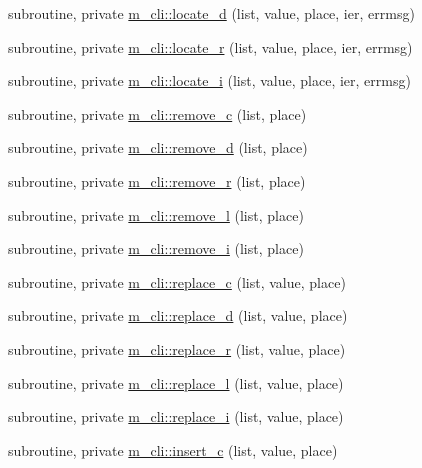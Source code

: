 \begin{DoxyCompactItemize}
\item 
subroutine, private \mbox{\hyperlink{namespacem__cli_a4187c24a2abf5cc630232965637493e8}{m\+\_\+cli\+::locate\+\_\+d}} (list, value, place, ier, errmsg)
\item 
subroutine, private \mbox{\hyperlink{namespacem__cli_ac44389e115b536069f324bffea7d2469}{m\+\_\+cli\+::locate\+\_\+r}} (list, value, place, ier, errmsg)
\item 
subroutine, private \mbox{\hyperlink{namespacem__cli_a36665ab0ea5080c14c8c9e52ed07d397}{m\+\_\+cli\+::locate\+\_\+i}} (list, value, place, ier, errmsg)
\item 
subroutine, private \mbox{\hyperlink{namespacem__cli_a05f549b10f50798d68003b8fd2a2d86a}{m\+\_\+cli\+::remove\+\_\+c}} (list, place)
\item 
subroutine, private \mbox{\hyperlink{namespacem__cli_abf22cbc2af66482f33b7bb1a210d9d99}{m\+\_\+cli\+::remove\+\_\+d}} (list, place)
\item 
subroutine, private \mbox{\hyperlink{namespacem__cli_a4f47701695b95c88fa4927c04996ce0f}{m\+\_\+cli\+::remove\+\_\+r}} (list, place)
\item 
subroutine, private \mbox{\hyperlink{namespacem__cli_a9c86f0f52ce71f14e774fd21f0686cf6}{m\+\_\+cli\+::remove\+\_\+l}} (list, place)
\item 
subroutine, private \mbox{\hyperlink{namespacem__cli_afa08d3d87184a6dd68a124231e536c93}{m\+\_\+cli\+::remove\+\_\+i}} (list, place)
\item 
subroutine, private \mbox{\hyperlink{namespacem__cli_a785aa0016768b6dc2e27c29d5342c329}{m\+\_\+cli\+::replace\+\_\+c}} (list, value, place)
\item 
subroutine, private \mbox{\hyperlink{namespacem__cli_aa9b7d672cc9fb0bc79fd09a2870614f5}{m\+\_\+cli\+::replace\+\_\+d}} (list, value, place)
\item 
subroutine, private \mbox{\hyperlink{namespacem__cli_ab3b33abc8a6da174d3f27c2f2203038c}{m\+\_\+cli\+::replace\+\_\+r}} (list, value, place)
\item 
subroutine, private \mbox{\hyperlink{namespacem__cli_a89ed5c3b944f91d8135173206fbc7e07}{m\+\_\+cli\+::replace\+\_\+l}} (list, value, place)
\item 
subroutine, private \mbox{\hyperlink{namespacem__cli_ac609c48bb1f904235b8cbf8bea61473f}{m\+\_\+cli\+::replace\+\_\+i}} (list, value, place)
\item 
subroutine, private \mbox{\hyperlink{namespacem__cli_a9baf1cf0e20942fbde8c025ead5a30db}{m\+\_\+cli\+::insert\+\_\+c}} (list, value, place)

\end{DoxyCompactItemize}
